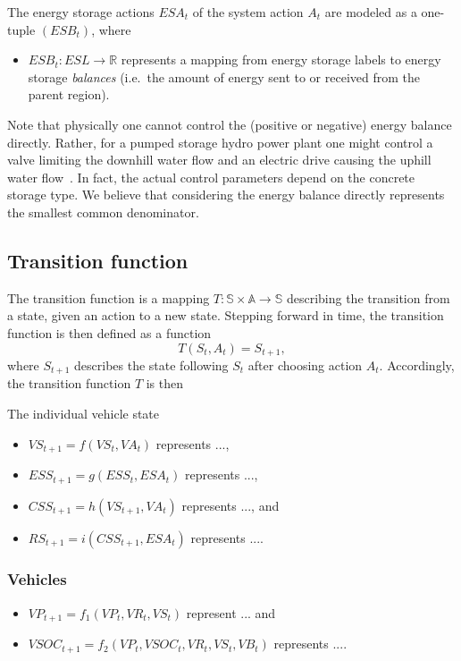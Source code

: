 The energy storage actions $ESA_t$ of the system action $A_t$ are modeled as a one-tuple $(ESB_t)$, where
\begin{itemize}
	\item $ESB_t: ESL \rightarrow \mathbb{R}$ represents a mapping from energy storage labels to energy storage \textit{balances} (i.e.\ the amount of energy sent to or received from the parent region).
\end{itemize}
Note that physically one cannot control the (positive or negative) energy balance directly. Rather, for a pumped storage hydro power plant one might control a valve limiting the downhill water flow and an electric drive causing the uphill water flow~\cite{Castronuovo2004}. In fact, the actual control parameters depend on the concrete storage type. We believe that considering the energy balance directly represents the smallest common denominator.

\subsection{Transition function}
\label{transitions}

The transition function is a mapping
$
	T: \mathbb{S} \times \mathbb{A} \rightarrow \mathbb{S}
$ describing the transition from a state, given an action to a new state.
Stepping forward in time, the transition function is then defined as a function
\[
	T(S_t, A_t) = S_{t+1} \mathrm{,}
\]
where $S_{t+1}$ describes the state following $S_t$ after choosing action $A_t$. Accordingly, the transition function $T$ is then

The individual vehicle state
\begin{itemize}
	\item $VS_{t+1} = f(VS_t, VA_t)$ represents ...,
	\item $ESS_{t+1} = g(ESS_t, ESA_t)$ represents ...,
	\item $CSS_{t+1} = h(VS_{t+1}, VA_t)$ represents ..., and
	\item $RS_{t+1} = i(CSS_{t+1}, ESA_t)$ represents ....
\end{itemize}

\subsubsection{Vehicles}
\label{transitions_vehicles}

\begin{itemize}
	\item $VP_{t+1} = f_1(VP_t, VR_t, VS_t)$ represent ... and
	\item $VSOC_{t+1} = f_2(VP_t, VSOC_t, VR_t, VS_t, VB_t)$ represents ....
\end{itemize}

